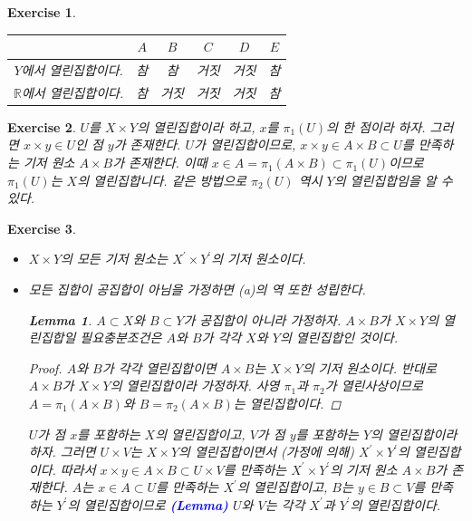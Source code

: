 \documentclass{article}
\newtheorem{exercise}{Exercise}[section]
\newtheorem*{lem}{Lemma}
\newcommand{\R}{\mathbb{R}}
\begin{document}
\begin{exercise}
    \phantom{}
    \begin{table}[H]
		\centering
		\begin{tabular}{c|ccccc}
			\toprule
			& $A$ & $B$ & $C$ & $D$ & $E$ \\
			\midrule
			$Y$에서 열린집합이다. & 참 & 참 & 거짓 & 거짓 & 참 \\
			\midrule
			$\R$에서 열린집합이다. & 참 & 거짓 & 거짓 & 거짓 & 참 \\
			\bottomrule
		\end{tabular}
	\end{table}
\end{exercise}

\begin{exercise}
    $U$를 $X\times Y$의 열린집합이라 하고, $x$를 $\pi_1(U)$의 한 점이라 하자. 그러면 $x\times y\in U$인 점 $y$가 존재한다. $U$가 열린집합이므로, $x\times y\in A\times B\subset U$를 만족하는 기저 원소 $A\times B$가 존재한다. 이때 $x\in A=\pi_1(A\times B)\subset\pi_1(U)$이므로 $\pi_1(U)$는 $X$의 열린집합니다. 같은 방법으로 $\pi_2(U)$ 역시 $Y$의 열린집합임을 알 수 있다.
\end{exercise}

\begin{exercise}
	\label{exc:16.5}
    \phantom{}
    \begin{itemize}
        \item[(a)] $X\times Y$의 모든 기저 원소는 $X^{\prime}\times Y^{\prime}$의 기저 원소이다.
        \item[(b)] 모든 집합이 공집합이 아님을 가정하면 (a)의 역 또한 성립한다.
            \begin{lem}
                $A\subset X$와 $B\subset Y$가 공집합이 아니라 가정하자. $A\times B$가 $X\times Y$의 열린집합일 필요충분조건은 $A$와 $B$가 각각 $X$와 $Y$의 열린집합인 것이다.
            \end{lem}
            \begin{proof}
                $A$와 $B$가 각각 열린집합이면 $A\times B$는 $X\times Y$의 기저 원소이다. 반대로 $A\times B$가 $X\times Y$의 열린집합이라 가정하자. 사영 $\pi_1$과 $\pi_2$가 열린사상이므로 $A=\pi_1(A\times B)$와 $B=\pi_2(A\times B)$는 열린집합이다.
            \end{proof}
        $U$가 점 $x$를 포함하는 $X$의 열린집합이고, $V$가 점 $y$를 포함하는 $Y$의 열린집합이라 하자. 그러면 $U\times V$는 $X\times Y$의 열린집합이면서 (가정에 의해) $X^{\prime}\times Y^{\prime}$의 열린집합이다. 따라서 $x\times y\in A\times B\subset U\times V$를 만족하는 $X^{\prime}\times Y^{\prime}$의 기저 원소 $A\times B$가 존재한다. $A$는 $x\in A\subset U$를 만족하는 $X^{\prime}$의 열린집합이고, $B$는 $y\in B\subset V$를 만족하는 $Y^{\prime}$의 열린집합이므로 \textcolor{blue}{\textbf{(Lemma)}} $U$와 $V$는 각각 $X^{\prime}$과 $Y^{\prime}$의 열린집합이다.
    \end{itemize}
\end{exercise}
\end{document}
